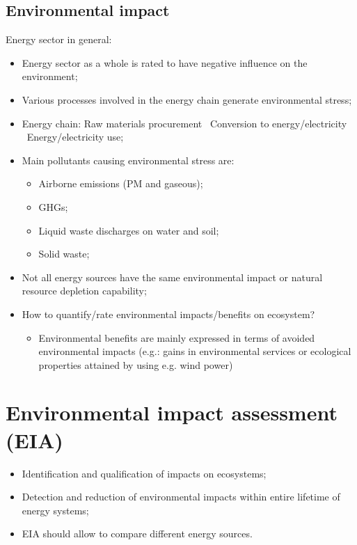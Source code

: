 \documentclass{article}
\newcommand{\tra}{\textrightarrow\ }
\begin{document}
\subsection{Environmental impact}
Energy sector in general:
\begin{itemize}
    \item Energy sector as a whole is rated to have negative influence on the environment;
    \item Various processes involved in the energy chain generate environmental stress;
    \item Energy chain: Raw materials procurement \tra Conversion to energy/electricity \tra Energy/electricity use;
    \item Main pollutants causing environmental stress are:
    \begin{itemize}[label=$\circ$]
        \item Airborne emissions (PM and gaseous);
        \item GHGs;
        \item Liquid waste discharges on water and soil;
        \item Solid waste;
    \end{itemize}
    \item Not all energy sources have the same environmental impact or natural resource depletion capability;
    \item How to quantify/rate environmental impacts/benefits on ecosystem?
    \begin{itemize}[label=\textrightarrow]
        \item Environmental benefits are mainly expressed in terms of avoided environmental impacts (e.g.: gains in environmental services or ecological properties attained by using e.g. wind power)
    \end{itemize} 
\end{itemize}

\section{Environmental impact assessment (EIA)}
\begin{itemize}
    \item Identification and qualification of impacts on ecosystems;
    \item Detection and reduction of environmental impacts within entire
        lifetime of energy systems;
    \item EIA should allow to compare different energy sources.
\end{itemize}
\end{document}

